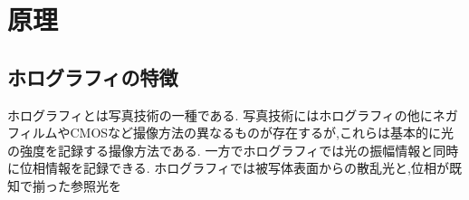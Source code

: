 \section{原理}
\subsection{ホログラフィの特徴}
ホログラフィとは写真技術の一種である.
写真技術にはホログラフィの他にネガフィルムやCMOSなど撮像方法の異なるものが存在するが,これらは基本的に光の強度を記録する撮像方法である.
一方でホログラフィでは光の振幅情報と同時に位相情報を記録できる.
ホログラフィでは被写体表面からの散乱光と,位相が既知で揃った参照光を
